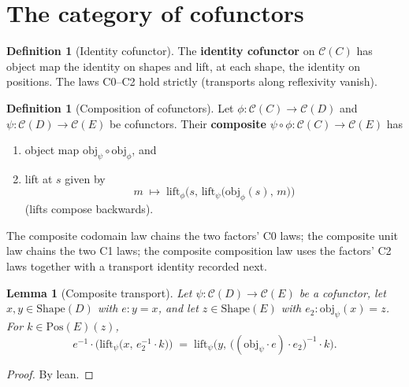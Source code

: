 \documentclass[11pt,a4paper]{article}
\theoremstyle{plain}
\newtheorem{lemma}[theorem]{Lemma}
\theoremstyle{definition}
\newtheorem{definition}[theorem]{Definition}
\newcommand{\Shape}{\mathrm{Shape}}
\newcommand{\Pos}{\mathrm{Pos}}
\newcommand{\cat}{\mathcal{C}}
\begin{document}
\section{The category of cofunctors}

\begin{definition}[Identity cofunctor]\label{def:cof-id}
The \textbf{identity cofunctor} on $\cat(C)$ has object map the identity on
shapes and lift, at each shape, the identity on positions. The laws C0--C2
hold strictly (transports along reflexivity vanish).
\end{definition}

\begin{definition}[Composition of cofunctors]\label{def:cof-comp}
Let $\phi:\cat(C)\to\cat(D)$ and $\psi:\cat(D)\to\cat(E)$ be cofunctors.
Their \textbf{composite} $\psi\circ\phi:\cat(C)\to\cat(E)$ has
\begin{enumerate}
  \item object map $\mathrm{obj}_\psi\circ\mathrm{obj}_\phi$, and
  \item lift at $s$ given by
        \[
          m \;\mapsto\;
          \mathrm{lift}_\phi\bigl(s,\,
            \mathrm{lift}_\psi\bigl(\mathrm{obj}_\phi(s),\,m\bigr)
          \bigr)
        \]
        (lifts compose backwards).
\end{enumerate}
The composite codomain law chains the two factors' C0 laws; the composite unit
law chains the two C1 laws; the composite composition law uses the factors' C2
laws together with a transport identity recorded next.
\end{definition}

\begin{lemma}[Composite transport]\label{lem:comp-transport}
Let $\psi:\cat(D)\to\cat(E)$ be a cofunctor, let $x,y\in\Shape(D)$ with
$e:y=x$, and let $z\in\Shape(E)$ with $e_2:\mathrm{obj}_\psi(x)=z$. For
$k\in\Pos(E)(z)$,
\begin{equation}
  e^{-1}\cdot\bigl(
    \mathrm{lift}_\psi\bigl(x,\, e_2^{-1}\cdot k\bigr)
  \bigr)
  \;=\;
  \mathrm{lift}_\psi\bigl(
    y,\,
    \bigl((\mathrm{obj}_\psi\cdot e)\cdot e_2\bigr)^{-1}\cdot k
  \bigr).
\end{equation}
\end{lemma}

\begin{proof}
By lean.
\end{proof}
\end{document}
